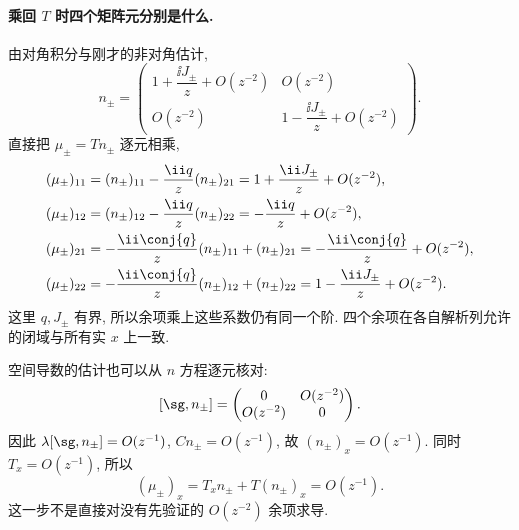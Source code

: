\paragraph{乘回 $ T$ 时四个矩阵元分别是什么.}
由对角积分与刚才的非对角估计,
\[
n_\pm=\begin{pmatrix}
1+\dfrac{\ii J_\pm}{z}+O(z^{-2})&O(z^{-2})\\
O(z^{-2})&1-\dfrac{\ii J_\pm}{z}+O(z^{-2})
\end{pmatrix}.
\]
直接把 $\mu_\pm= Tn_\pm$ 逐元相乘,
\begin{align*}
(\mu_\pm)_{11}
&=(n_\pm)_{11}-\dfrac{\ii q}{z}(n_\pm)_{21}
=1+\dfrac{\ii J_\pm}{z}+O(z^{-2}),\\
(\mu_\pm)_{12}
&=(n_\pm)_{12}-\dfrac{\ii q}{z}(n_\pm)_{22}
=-\dfrac{\ii q}{z}+O(z^{-2}),\\
(\mu_\pm)_{21}
&=-\dfrac{\ii\conj{q}}{z}(n_\pm)_{11}+(n_\pm)_{21}
=-\dfrac{\ii\conj{q}}{z}+O(z^{-2}),\\
(\mu_\pm)_{22}
&=-\dfrac{\ii\conj{q}}{z}(n_\pm)_{12}+(n_\pm)_{22}
=1-\dfrac{\ii J_\pm}{z}+O(z^{-2}).
\end{align*}
这里 $q,J_\pm$ 有界, 所以余项乘上这些系数仍有同一个阶.
四个余项在各自解析列允许的闭域与所有实 $x$ 上一致.

空间导数的估计也可以从 $n$ 方程逐元核对:
\[
[\sg,n_\pm]=\begin{pmatrix}0&O(z^{-2})\\O(z^{-2})&0\end{pmatrix}.
\]
因此 $\lambda[\sg,n_\pm]=O(z^{-1})$,
$ Cn_\pm=O(z^{-1})$, 故 $(n_\pm)_x=O(z^{-1})$.
同时 $ T_x=O(z^{-1})$, 所以
\[
(\mu_\pm)_x= T_xn_\pm+ T(n_\pm)_x=O(z^{-1}).
\]
这一步不是直接对没有先验证的 $O(z^{-2})$ 余项求导.

